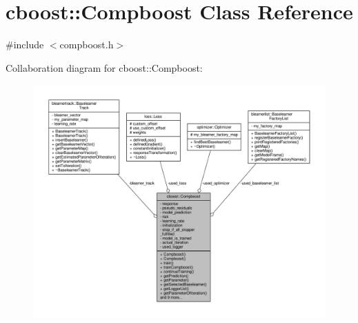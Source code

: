 \hypertarget{classcboost_1_1_compboost}{}\section{cboost\+:\+:Compboost Class Reference}
\label{classcboost_1_1_compboost}


{\ttfamily \#include $<$compboost.\+h$>$}



Collaboration diagram for cboost\+:\+:Compboost\+:
\nopagebreak
\begin{figure}[H]
\begin{center}
\leavevmode
\includegraphics[width=350pt]{classcboost_1_1_compboost__coll__graph}
\end{center}
\end{figure}
